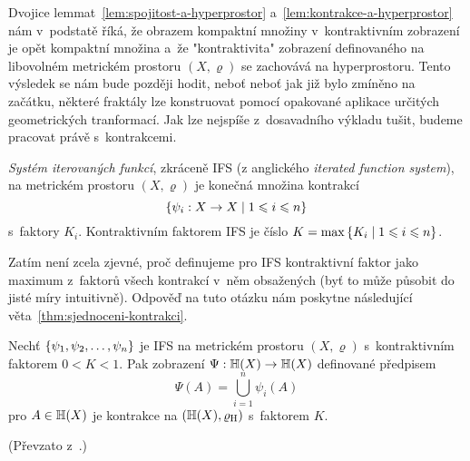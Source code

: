 Dvojice lemmat~\ref{lem:spojitost-a-hyperprostor} a~\ref{lem:kontrakce-a-hyperprostor} nám v~podstatě říká, že obrazem kompaktní množiny v~kontraktivním zobrazení je opět kompaktní množina a~že "kontraktivita" zobrazení definovaného na libovolném metrickém prostoru $(X,\varrho)$ se zachovává na hyperprostoru. Tento výsledek se nám bude později hodit, neboť neboť jak již bylo zmíněno na začátku, některé fraktály lze konstruovat pomocí opakované aplikace určitých geometrických tranformací. Jak lze nejspíše z~dosavadního výkladu tušit, budeme pracovat právě s~kontrakcemi.
\begin{definition}\label{def:system-iterovanych-funkci}
    \emph{Systém iterovaných funkcí}, zkráceně IFS (z anglického \emph{iterated function system}), na metrickém prostoru $(X,\varrho)$ je konečná množina kontrakcí
    \[\left\{\psi_i:X \rightarrow X\mid 1\leqslant i\leqslant n\right\}\]
    s~faktory $K_i$. Kontraktivním faktorem IFS je číslo $K=\max\left\{K_i\mid 1\leqslant i\leqslant n\right\}$.
\end{definition}
Zatím není zcela zjevné, proč definujeme pro IFS kontraktivní faktor jako maximum z~faktorů všech kontrakcí v~něm obsažených (byť to může působit do jisté míry intuitivně). Odpověď na tuto otázku nám poskytne následující věta~\ref{thm:sjednoceni-kontrakci}.
\begin{theorem}\label{thm:sjednoceni-kontrakci}
    Nechť $\left\{\psi_1,\psi_2,\ldots,\psi_n\right\}$ je IFS na metrickém prostoru $(X,\varrho)$ s~kontraktivním faktorem $0<K<1$. Pak zobrazení $\Psi:\mathbb{H}(X) \rightarrow \mathbb{H}(X)$ definované předpisem
    \[\Psi(A)=\bigcup_{i=1}^n\psi_i(A)\]
    pro $A\in\mathbb{H}(X)$ je kontrakce na $(\mathbb{H}(X),\varrho_\textup{H})$ s~faktorem $K$.
\end{theorem}
(Převzato z~\citep[str. 81]{Barnsley1993}.)
